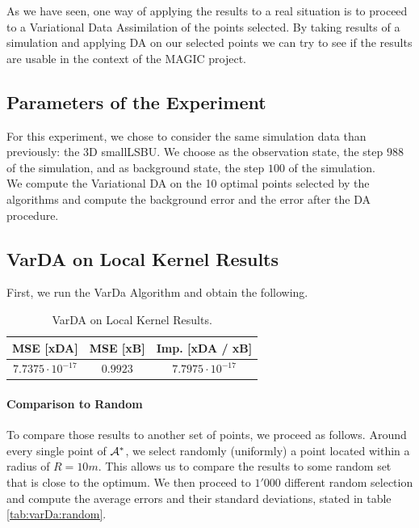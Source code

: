 As we have seen, one way of applying the results to a real situation is to proceed to a Variational Data Assimilation of the points selected. By taking results of a simulation and applying DA on our selected points we can try to see if the results are usable in the context of the MAGIC project. 

\subsection{Parameters of the Experiment} 

For this experiment, we chose to consider the same simulation data than previously: the 3D smallLSBU.  We choose as the observation state, the step $988$ of the simulation, and as background state, the step $100$ of the simulation. \\

We compute the Variational DA on the 10 optimal points selected by the algorithms and compute the background error and the error after the DA procedure.  
%

\subsection{VarDA on Local Kernel Results}

First, we run the VarDa Algorithm and obtain the following. 
\begin{table}[h]
\centering
    \begin{tabular}{c|c|c}
    \toprule
          MSE [xDA] & MSE [xB] &  Imp. [xDA / xB] \\ \midrule
         $7.7375 \cdot 10^{-17}$ &  $0.9923$ & $7.7975 \cdot 10^{-17}$ \\ \bottomrule
    \end{tabular}
    \caption{VarDA on Local Kernel Results. }
\end{table}

\paragraph{Comparison to Random}

To compare those results to another set of points, we proceed as follows. Around every single point of $\mathcal{A}^*$, we select randomly (uniformly) a point located within a radius of $R=10m$. This allows us to compare the results to some random set that is close to the optimum. We then proceed to $1'000$ different random selection and compute the average errors and their standard deviations, stated in table \ref{tab:varDa:random}. \\



